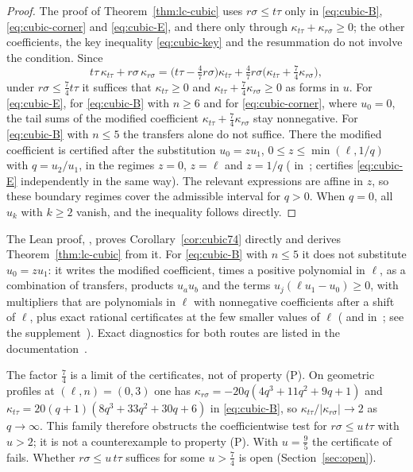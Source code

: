 \begin{proof}
The proof of Theorem~\ref{thm:lc-cubic} uses $r\sigma\leq t\tau$ only in \eqref{eq:cubic-B}, \eqref{eq:cubic-corner} and \eqref{eq:cubic-E}, and there only through $\kappa_{t\tau}+\kappa_{r\sigma}\geq0$; the other coefficients, the key inequality \eqref{eq:cubic-key} and the resummation do not involve the condition. Since
\[
t\tau\,\kappa_{t\tau}+r\sigma\,\kappa_{r\sigma}=\bigl(t\tau-\tfrac47r\sigma\bigr)\kappa_{t\tau}+\tfrac47r\sigma\bigl(\kappa_{t\tau}+\tfrac74\kappa_{r\sigma}\bigr),
\]
under $r\sigma\leq\frac74t\tau$ it suffices that $\kappa_{t\tau}\geq0$ and $\kappa_{t\tau}+\frac74\kappa_{r\sigma}\geq0$ as forms in $u$. For \eqref{eq:cubic-E}, for \eqref{eq:cubic-B} with $n\geq6$ and for \eqref{eq:cubic-corner}, where $u_0=0$, the tail sums of the modified coefficient $\kappa_{t\tau}+\frac74\kappa_{r\sigma}$ stay nonnegative. For \eqref{eq:cubic-B} with $n\leq5$ the transfers alone do not suffice. There the modified coefficient is certified after the substitution $u_0=zu_1$, $0\leq z\leq\min(\ell,1/q)$ with $q=u_2/u_1$, in the regimes $z=0$, $z=\ell$ and $z=1/q$ ( in~\cite{code};  certifies \eqref{eq:cubic-E} independently in the same way). The relevant expressions are affine in $z$, so these boundary regimes cover the admissible interval for $q>0$. When $q=0$, all $u_k$ with $k\geq2$ vanish, and the inequality follows directly.
\end{proof}

The Lean proof, , proves Corollary~\ref{cor:cubic74} directly and derives Theorem~\ref{thm:lc-cubic} from it. For \eqref{eq:cubic-B} with $n\leq5$ it does not substitute $u_0=zu_1$: it writes the modified coefficient, times a positive polynomial in $\ell$, as a combination of transfers, products $u_au_b$ and the terms $u_j(\ell u_1-u_0)\geq0$, with multipliers that are polynomials in $\ell$ with nonnegative coefficients after a shift of $\ell$, plus exact rational certificates at the few smaller values of $\ell$ ( and  in~\cite{code}; see the supplement~\cite{supp}). Exact diagnostics for both routes are listed in the documentation~\cite{docs}.

\begin{remark}\label{rem:cubic-limit}
The factor $\frac74$ is a limit of the certificates, not of property (P). On geometric profiles at $(\ell,n)=(0,3)$ one has $\kappa_{r\sigma}=-20q(4q^3+11q^2+9q+1)$ and $\kappa_{t\tau}=20(q+1)(8q^3+33q^2+30q+6)$ in \eqref{eq:cubic-B}, so $\kappa_{t\tau}/|\kappa_{r\sigma}|\to2$ as $q\to\infty$. This family therefore obstructs the coefficientwise test for $r\sigma\leq u\,t\tau$ with $u>2$; it is not a counterexample to property (P). With $u=\frac95$ the certificate of  fails. Whether $r\sigma\leq u\,t\tau$ suffices for some $u>\frac74$ is open (Section~\ref{sec:open}).
\end{remark}

